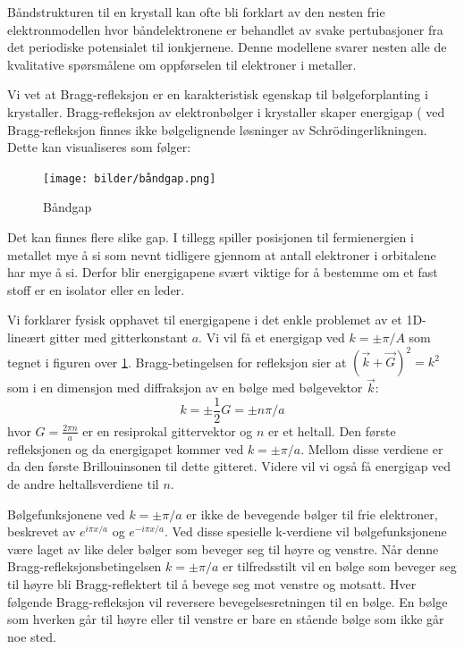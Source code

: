 \documentclass{article}
\begin{document}
Båndstrukturen til en krystall kan ofte bli forklart av den nesten frie elektronmodellen hvor båndelektronene er behandlet av svake pertubasjoner fra det periodiske potensialet til ionkjernene. Denne modellene svarer nesten alle de kvalitative spørsmålene om oppførselen til elektroner i metaller.

Vi vet at Bragg-refleksjon er en karakteristisk egenskap til bølgeforplanting i krystaller. Bragg-refleksjon av elektronbølger i krystaller skaper energigap ( ved Bragg-refleksjon finnes ikke bølgelignende løsninger av Schrödingerlikningen. Dette kan visualiseres som følger:
\begin{figure}[H]
    \centering
    \texttt{[image: bilder/båndgap.png]}
    \caption{Båndgap}
    \label{fig:båndgap}
\end{figure}
Det kan finnes flere slike gap. I tillegg spiller posisjonen til fermienergien i metallet mye å si som nevnt tidligere gjennom at antall elektroner i orbitalene har mye å si. Derfor blir energigapene svært viktige for å bestemme om et fast stoff er en isolator eller en leder.

Vi forklarer fysisk opphavet til energigapene i det enkle problemet av et 1D-lineært gitter med gitterkonstant $a$. Vi vil få et energigap ved $k = \pm \pi/A$ som tegnet i figuren over \ref{fig:båndgap}. Bragg-betingelsen for refleksjon sier at $(\vec{k} + \vec{G})^2 = k^2$ som i en dimensjon med diffraksjon av en bølge med bølgevektor $\vec{k}$:
\begin{equation}
    k = \pm \frac{1}{2} G = \pm n \pi / a
\end{equation}
hvor $G = \frac{2\pi n}{a}$ er en resiprokal gittervektor og $n$ er et heltall. Den første refleksjonen og da energigapet kommer ved $k = \pm \pi/a$. Mellom disse verdiene er da den første Brillouinsonen til dette gitteret. Videre vil vi også få energigap ved de andre heltallsverdiene til $n$.

Bølgefunksjonene ved $k=\pm \pi/a$ er ikke de bevegende bølger til frie elektroner, beskrevet av $e^{i \pi x / a}$ og $e^{-i \pi x / a}$. Ved disse spesielle k-verdiene vil bølgefunksjonene være laget av like deler bølger som beveger seg til høyre og venstre. Når denne Bragg-refleksjonsbetingelsen $k = \pm \pi / a$ er tilfredsstilt vil en bølge som beveger seg til høyre bli Bragg-reflektert til å bevege seg mot venstre og motsatt. Hver følgende Bragg-refleksjon vil reversere bevegelsesretningen til en bølge. En bølge som hverken går til høyre eller til venstre er bare en stående bølge som ikke går noe sted.
\end{document}
